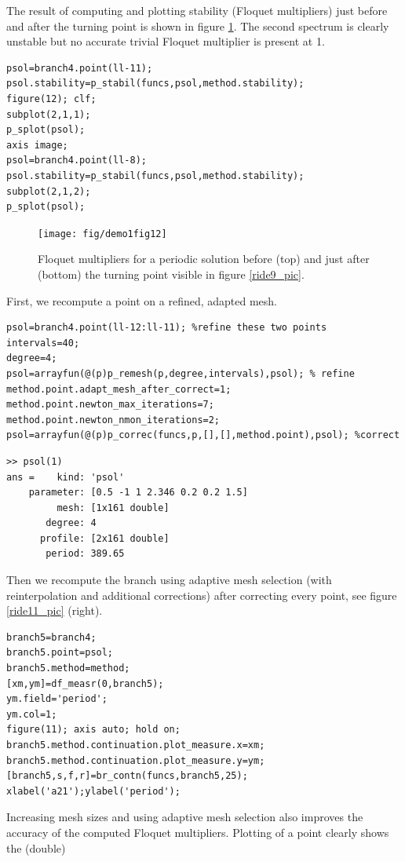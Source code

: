\documentclass[10pt]{scrartcl}
\begin{document}
The result of computing and plotting stability (Floquet multipliers) 
just before
and after the turning point is shown in figure \ref{ride12_pic}. 
The second spectrum is clearly unstable but no accurate trivial
Floquet multiplier is present at 1. 
\begin{lstlisting}
psol=branch4.point(ll-11);
psol.stability=p_stabil(funcs,psol,method.stability);
figure(12); clf;
subplot(2,1,1);
p_splot(psol);
axis image;
psol=branch4.point(ll-8);
psol.stability=p_stabil(funcs,psol,method.stability);
subplot(2,1,2);
p_splot(psol);  
\end{lstlisting}
\begin{figure}[h]
\begin{center}
  \texttt{[image: fig/demo1fig12]}
\end{center}
\caption{\label{ride12_pic}Floquet multipliers for
a periodic solution before (top) and just after (bottom)
the turning point visible in figure \ref{ride9_pic}.}
\end{figure}
First, we recompute a point on a refined, adapted mesh.
\begin{lstlisting}
psol=branch4.point(ll-12:ll-11); %refine these two points
intervals=40;
degree=4;
psol=arrayfun(@(p)p_remesh(p,degree,intervals),psol); % refine
method.point.adapt_mesh_after_correct=1;
method.point.newton_max_iterations=7;
method.point.newton_nmon_iterations=2;
psol=arrayfun(@(p)p_correc(funcs,p,[],[],method.point),psol); %correct  
\end{lstlisting}
{
\small
\begin{verbatim}
>> psol(1)
ans =    kind: 'psol'
    parameter: [0.5 -1 1 2.346 0.2 0.2 1.5]
         mesh: [1x161 double]
       degree: 4
      profile: [2x161 double]
       period: 389.65
\end{verbatim}}
Then we recompute the branch using adaptive mesh selection
(with reinterpolation and additional corrections) 
after correcting every point, see figure \ref{ride11_pic} (right).
\begin{lstlisting}
branch5=branch4;
branch5.point=psol;
branch5.method=method;
[xm,ym]=df_measr(0,branch5);
ym.field='period';
ym.col=1;
figure(11); axis auto; hold on;
branch5.method.continuation.plot_measure.x=xm;
branch5.method.continuation.plot_measure.y=ym;
[branch5,s,f,r]=br_contn(funcs,branch5,25);
xlabel('a21');ylabel('period');  
\end{lstlisting}
Increasing mesh sizes and using adaptive mesh selection
also improves the accuracy of the computed Floquet multipliers.
Plotting of a point clearly shows the (double)
\end{document}
